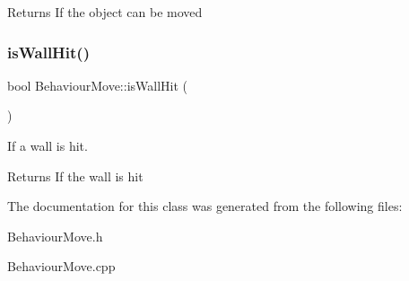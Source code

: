 \begin{DoxyReturn}{Returns}
If the object can be moved
\end{DoxyReturn}
\mbox{\label{class_behaviour_move_aebfd734f768321735b20f4e66ea1faab}} 
\subsubsection{\texorpdfstring{is\+Wall\+Hit()}{isWallHit()}}
{\footnotesize\ttfamily bool Behaviour\+Move\+::is\+Wall\+Hit (\begin{DoxyParamCaption}{ }\end{DoxyParamCaption})}



If a wall is hit. 

\begin{DoxyReturn}{Returns}
If the wall is hit
\end{DoxyReturn}


The documentation for this class was generated from the following files\+:\begin{DoxyCompactItemize}
\item 
Behaviour\+Move.\+h\item 
Behaviour\+Move.\+cpp\end{DoxyCompactItemize}
